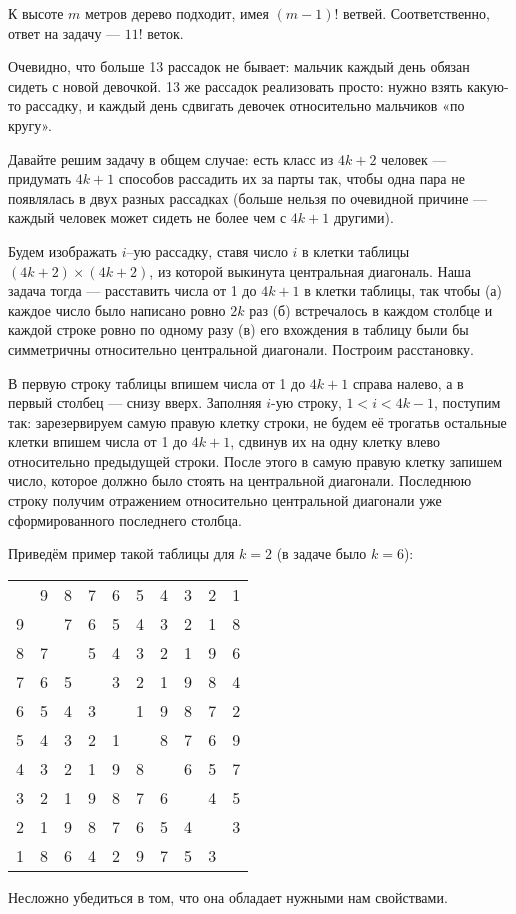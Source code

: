 \begin{itemize}

\itA К высоте $m$ метров дерево подходит, имея $(m-1)!$ ветвей. Соответственно, ответ на задачу — $11!$ веток.

\itB Очевидно, что больше 13 рассадок не бывает: мальчик каждый день обязан сидеть с новой девочкой. 13 же рассадок реализовать просто: нужно взять какую-то рассадку, и каждый день сдвигать девочек относительно мальчиков «по кругу».

\itC Давайте решим задачу в общем случае: есть класс из $4k+2$ человек — придумать $4k+1$ способов рассадить их за парты так, чтобы одна пара не появлялась в двух разных рассадках (больше нельзя по очевидной причине — каждый человек может сидеть не более чем с $4k+1$ другими).

Будем изображать $i$--ую рассадку, ставя число $i$ в клетки таблицы $(4k+2) \times (4k+2)$, из которой выкинута центральная диагональ. Наша задача тогда — расставить числа от 1 до $4k+1$ в клетки таблицы, так чтобы (а) каждое число было написано ровно $2k$ раз (б) встречалось в каждом столбце и каждой строке ровно по одному разу (в) его вхождения в таблицу были бы симметричны относительно центральной диагонали. Построим расстановку.

В первую строку таблицы впишем числа от 1 до $4k+1$ справа налево, а в первый столбец — снизу вверх. Заполняя $i$-ую строку, $1<i<4k-1$, поступим так: зарезервируем самую правую клетку строки, не будем её трогать\scolon в остальные клетки впишем числа от 1 до $4k+1$, сдвинув их на одну клетку влево относительно предыдущей строки. После этого в самую правую клетку запишем число, которое должно было стоять на центральной диагонали. Последнюю строку получим отражением относительно центральной диагонали уже сформированного последнего столбца.

Приведём пример такой таблицы для $k=2$ (в задаче было $k=6$):

\begin{center}
\begin{tabular}{|cccccccccc|}

\hline
  & 9 & 8 & 7 & 6 & 5 & 4 & 3 & 2 & 1 \\
9 &   & 7 & 6 & 5 & 4 & 3 & 2 & 1 & 8 \\
8 & 7 &   & 5 & 4 & 3 & 2 & 1 & 9 & 6 \\
7 & 6 & 5 &   & 3 & 2 & 1 & 9 & 8 & 4 \\
6 & 5 & 4 & 3 &   & 1 & 9 & 8 & 7 & 2 \\
5 & 4 & 3 & 2 & 1 &   & 8 & 7 & 6 & 9 \\
4 & 3 & 2 & 1 & 9 & 8 &   & 6 & 5 & 7 \\
3 & 2 & 1 & 9 & 8 & 7 & 6 &   & 4 & 5 \\
2 & 1 & 9 & 8 & 7 & 6 & 5 & 4 &   & 3 \\
1 & 8 & 6 & 4 & 2 & 9 & 7 & 5 & 3 &  \\ \hline

\end{tabular}
\end{center}

\noindent Несложно убедиться в том, что она обладает нужными нам свойствами.

\end{itemize}
